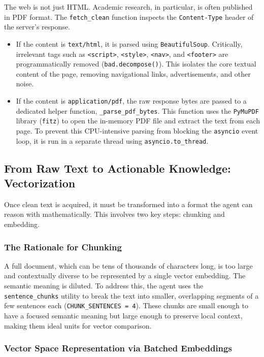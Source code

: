 \documentclass[12pt, a4paper]{article}
\begin{document}
The web is not just HTML. Academic research, in particular, is often published in PDF format. The \verb|fetch_clean| function inspects the \verb|Content-Type| header of the server's response.

\begin{itemize}
    \item If the content is \verb|text/html|, it is parsed using \verb|BeautifulSoup|. Critically, irrelevant tags such as \verb|<script>|, \verb|<style>|, \verb|<nav>|, and \verb|<footer>| are programmatically removed (\verb|bad.decompose()|). This isolates the core textual content of the page, removing navigational links, advertisements, and other noise.
    \item If the content is \verb|application/pdf|, the raw response bytes are passed to a dedicated helper function, \verb|_parse_pdf_bytes|. This function uses the \verb|PyMuPDF| library (\verb|fitz|) to open the in-memory PDF file and extract the text from each page. To prevent this CPU-intensive parsing from blocking the \verb|asyncio| event loop, it is run in a separate thread using \verb|asyncio.to_thread|.
\end{itemize}

\subsection{From Raw Text to Actionable Knowledge: Vectorization}

Once clean text is acquired, it must be transformed into a format the agent can reason with mathematically. This involves two key steps: chunking and embedding.

\subsubsection{The Rationale for Chunking}

A full document, which can be tens of thousands of characters long, is too large and contextually diverse to be represented by a single vector embedding. The semantic meaning is diluted. To address this, the agent uses the \verb|sentence_chunks| utility to break the text into smaller, overlapping segments of a few sentences each (\verb|CHUNK_SENTENCES = 4|). These chunks are small enough to have a focused semantic meaning but large enough to preserve local context, making them ideal units for vector comparison.

\subsubsection{Vector Space Representation via Batched Embeddings}
\end{document}
